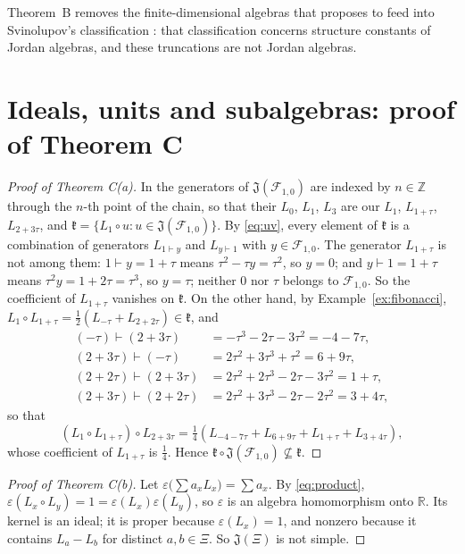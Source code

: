 \documentclass[11pt]{amsart}
\theoremstyle{definition}
\theoremstyle{remark}
\newcommand{\R}{\mathbb{R}}
\newcommand{\Z}{\mathbb{Z}}
\newcommand{\J}{\mathfrak{J}}
\newcommand{\qa}{\vdash}
\begin{document}
Theorem~B removes the finite-dimensional algebras that \cite[Section~6]{CCAI23} proposes to feed into Svinolupov's classification \cite{Svi91}: that classification concerns structure constants of Jordan algebras, and these truncations are not Jordan algebras.

\section{Ideals, units and subalgebras: proof of Theorem C}

\begin{proof}[Proof of Theorem C(a)]
In \cite[Section~5]{CCAI23} the generators of $\J(\mathcal F_{1,0})$ are indexed by $n\in\Z$ through the $n$-th point of the chain, so that their $L_0$, $L_1$, $L_3$ are our $L_1$, $L_{1+\tau}$, $L_{2+3\tau}$, and $\mathfrak k=\{L_1\circ u:u\in\J(\mathcal F_{1,0})\}$. By \eqref{eq:uv}, every element of $\mathfrak k$ is a combination of generators $L_{1\qa y}$ and $L_{y\qa1}$ with $y\in\mathcal F_{1,0}$. The generator $L_{1+\tau}$ is not among them: $1\qa y=1+\tau$ means $\tau^2-\tau y=\tau^2$, so $y=0$; and $y\qa1=1+\tau$ means $\tau^2y=1+2\tau=\tau^3$, so $y=\tau$; neither $0$ nor $\tau$ belongs to $\mathcal F_{1,0}$. So the coefficient of $L_{1+\tau}$ vanishes on $\mathfrak k$. On the other hand, by Example~\ref{ex:fibonacci}, $L_1\circ L_{1+\tau}=\frac12(L_{-\tau}+L_{2+2\tau})\in\mathfrak k$, and
\begin{align*}
(-\tau)\qa(2+3\tau)&=-\tau^3-2\tau-3\tau^2=-4-7\tau,\\
(2+3\tau)\qa(-\tau)&=2\tau^2+3\tau^3+\tau^2=6+9\tau,\\
(2+2\tau)\qa(2+3\tau)&=2\tau^2+2\tau^3-2\tau-3\tau^2=1+\tau,\\
(2+3\tau)\qa(2+2\tau)&=2\tau^2+3\tau^3-2\tau-2\tau^2=3+4\tau,
\end{align*}
so that
\[
(L_1\circ L_{1+\tau})\circ L_{2+3\tau}=\tfrac14\left(L_{-4-7\tau}+L_{6+9\tau}+L_{1+\tau}+L_{3+4\tau}\right),
\]
whose coefficient of $L_{1+\tau}$ is $\frac14$. Hence $\mathfrak k\circ\J(\mathcal F_{1,0})\not\subseteq\mathfrak k$.
\end{proof}

\begin{proof}[Proof of Theorem C(b)]
Let $\varepsilon\bigl(\sum a_xL_x\bigr)=\sum a_x$. By \eqref{eq:product}, $\varepsilon(L_x\circ L_y)=1=\varepsilon(L_x)\varepsilon(L_y)$, so $\varepsilon$ is an algebra homomorphism onto $\R$. Its kernel is an ideal; it is proper because $\varepsilon(L_x)=1$, and nonzero because it contains $L_a-L_b$ for distinct $a,b\in\Xi$. So $\J(\Xi)$ is not simple.
\end{proof}
\end{document}
